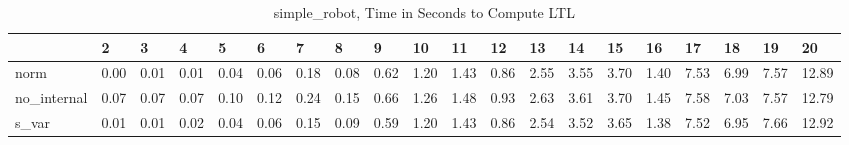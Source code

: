 \begin{table}
\centering
\caption{simple_robot, Time in Seconds to Compute LTL}
\label{simple_robot_LTL_time}
\begin{tabular}{llllllllllllllllllll}
\toprule
{} &     2 &     3 &     4 &     5 &     6 &     7 &     8 &     9 &    10 &    11 &    12 &    13 &    14 &    15 &    16 &    17 &    18 &    19 &     20 \\
\midrule
norm        &  0.00 &  0.01 &  0.01 &  0.04 &  0.06 &  0.18 &  0.08 &  0.62 &  1.20 &  1.43 &  0.86 &  2.55 &  3.55 &  3.70 &  1.40 &  7.53 &  6.99 &  7.57 &  12.89 \\
no\_internal &  0.07 &  0.07 &  0.07 &  0.10 &  0.12 &  0.24 &  0.15 &  0.66 &  1.26 &  1.48 &  0.93 &  2.63 &  3.61 &  3.70 &  1.45 &  7.58 &  7.03 &  7.57 &  12.79 \\
s\_var       &  0.01 &  0.01 &  0.02 &  0.04 &  0.06 &  0.15 &  0.09 &  0.59 &  1.20 &  1.43 &  0.86 &  2.54 &  3.52 &  3.65 &  1.38 &  7.52 &  6.95 &  7.66 &  12.92 \\
\bottomrule
\end{tabular}
\end{table}
